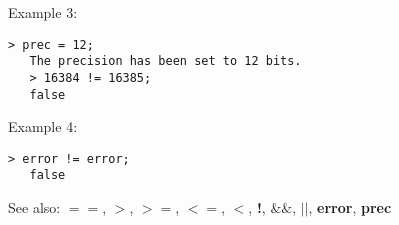 \noindent Example 3: 
\begin{center}\begin{minipage}{14.8cm}\begin{Verbatim}[frame=single]
   > prec = 12;
   The precision has been set to 12 bits.
   > 16384 != 16385;
   false
\end{Verbatim}
\end{minipage}\end{center}
\noindent Example 4: 
\begin{center}\begin{minipage}{14.8cm}\begin{Verbatim}[frame=single]
   > error != error;
   false
\end{Verbatim}
\end{minipage}\end{center}
See also: \textbf{$==$}, \textbf{$>$}, \textbf{$>=$}, \textbf{$<=$}, \textbf{$<$}, \textbf{!}, \textbf{$\&\&$}, \textbf{$||$}, \textbf{error}, \textbf{prec}
